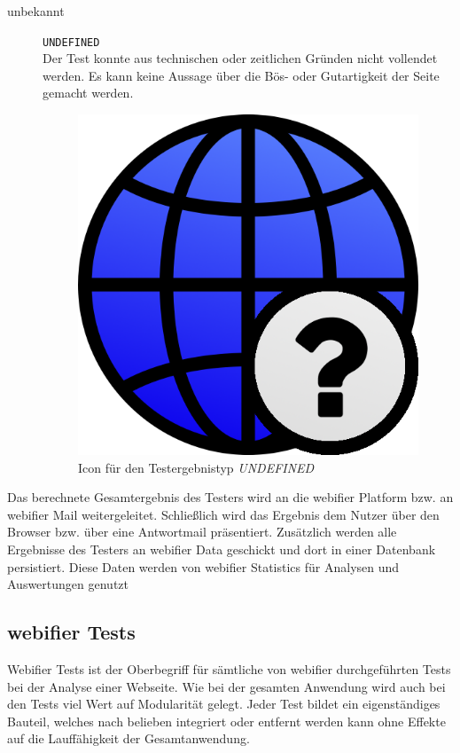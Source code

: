 \begin{description}
	\item[unbekannt] \hfill \texttt{UNDEFINED} \\
	Der Test konnte aus technischen oder zeitlichen Gründen nicht vollendet werden.
	Es kann keine Aussage über die Bös- oder Gutartigkeit der Seite gemacht werden.
	\begin{figure}[H]
		\centering
		\includegraphics[scale=0.2]{images/webifier-undefined}
		\caption{Icon für den Testergebnistyp \textit{UNDEFINED}}
	\end{figure}
\end{description}

Das berechnete Gesamtergebnis des Testers wird an die webifier Platform bzw. an webifier
Mail weitergeleitet. Schließlich wird das Ergebnis dem Nutzer über den Browser bzw. über eine
Antwortmail präsentiert. Zusätzlich werden alle Ergebnisse des Testers an webifier Data geschickt
und dort in einer Datenbank persistiert. Diese Daten werden von webifier Statistics für Analysen und
Auswertungen genutzt

\subsection{webifier Tests}
Webifier Tests ist der Oberbegriff für sämtliche von webifier durchgeführten Tests bei der Analyse einer Webseite. Wie bei der gesamten Anwendung wird auch bei den Tests viel Wert auf Modularität gelegt. Jeder Test bildet ein eigenständiges Bauteil, welches nach belieben integriert oder entfernt werden kann ohne Effekte auf die Lauffähigkeit der Gesamtanwendung.

